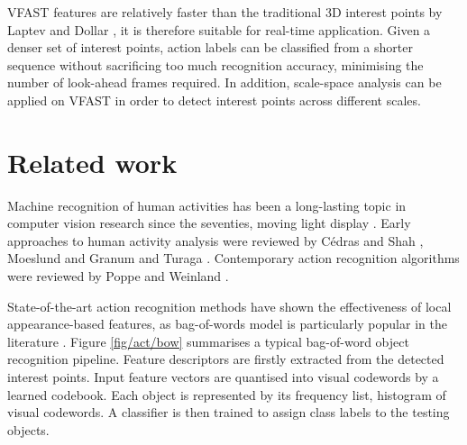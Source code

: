 VFAST features are relatively faster than the traditional 3D interest points by Laptev \cite{Laptev2005} and Dollar \etal \cite{Dollar2005}, it is therefore suitable for real-time application. 
Given a denser set of interest points, action labels can be classified from a shorter sequence without sacrificing too much recognition accuracy, minimising the number of look-ahead frames required. 
In addition, scale-space analysis can be applied on VFAST in order to detect interest points across different scales.



\section{Related work}
\label{sec/act/relatedwork}

Machine recognition of human activities has been a long-lasting topic in computer vision research since the seventies, \eg moving light display \cite{Johansson1973}. Early approaches to human activity analysis were reviewed by C\'edras and Shah \cite{Cedras1995}, Moeslund and Granum \cite{Moeslund2001} and Turaga \etal \cite{Turaga2008}. Contemporary action recognition algorithms were reviewed by Poppe \cite{Poppe2010} and Weinland \etal \cite{Weinland2011}.   

State-of-the-art action recognition methods have shown the effectiveness of local appearance-based features, as bag-of-words model is particularly popular in the literature \cite{Schuldt2004, Dollar2005, Riemenschneider2009, Niebles2008, Wong2007}.
Figure \ref{fig/act/bow} summarises a typical bag-of-word object recognition pipeline. Feature descriptors are firstly extracted from the detected interest points. Input feature vectors are quantised into visual codewords by a learned codebook. Each object is represented by its frequency list, \ie histogram of visual codewords. A classifier is then trained to assign class labels to the testing objects.

